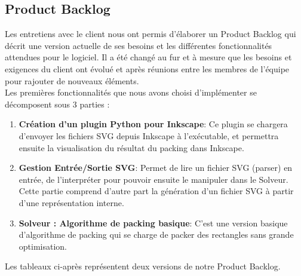 

\subsection{Product Backlog}

Les entretiens avec le client nous ont permis d'élaborer un Product Backlog qui décrit une version actuelle de ses besoins et les différentes fonctionnalités attendues pour le logiciel. Il a été changé au fur et à mesure que les besoins et exigences du client ont évolué et après réunions entre les membres de l'équipe pour rajouter de nouveaux éléments.\\

Les premières fonctionnalités que nous avons choisi d'implémenter se décomposent sous 3 parties : 
\begin{enumerate}
    \item \textbf{Création d'un plugin Python pour Inkscape}: Ce plugin se chargera d'envoyer les fichiers SVG depuis Inkscape à l'exécutable, et permettra ensuite la visualisation du résultat du packing dans Inkscape.
    \item \textbf{Gestion Entrée/Sortie SVG}: Permet de lire un fichier SVG (parser) en entrée, de l'interpréter pour pouvoir ensuite le manipuler dans le Solveur. Cette partie comprend d'autre part la génération d'un fichier SVG à partir d'une représentation interne.
    \item \textbf{Solveur : Algorithme de packing basique}: C'est une version basique d'algorithme de packing qui se charge de packer des rectangles sans grande optimisation.
\end{enumerate}


Les tableaux ci-après représentent deux versions de notre Product Backlog.

